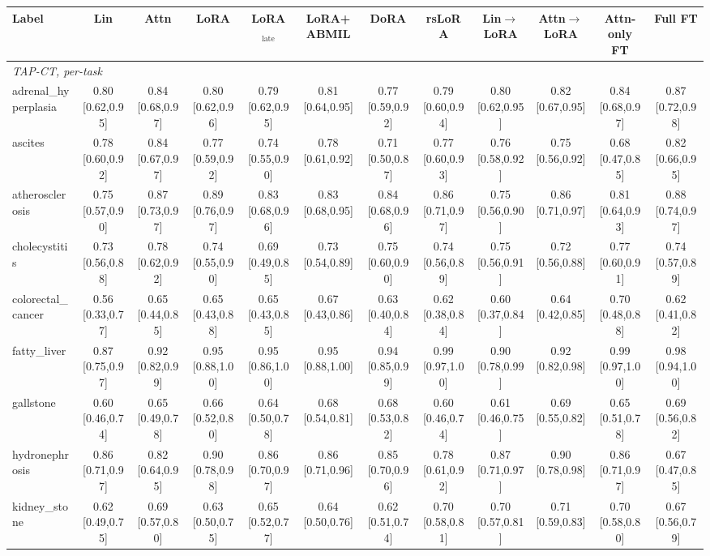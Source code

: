 \begin{tabular}{lccccccccccc}
\toprule
Label & Lin & Attn & LoRA & LoRA$_{\text{late}}$ & LoRA+ABMIL & DoRA & rsLoRA & Lin$\to$LoRA & Attn$\to$LoRA & Attn-only FT & Full FT \\
\midrule
\multicolumn{12}{l}{\textit{TAP-CT, per-task}} \\
adrenal\_hyperplasia & 0.80 [0.62,0.95] & 0.84 [0.68,0.97] & 0.80 [0.62,0.96] & 0.79 [0.62,0.95] & 0.81 [0.64,0.95] & 0.77 [0.59,0.92] & 0.79 [0.60,0.94] & 0.80 [0.62,0.95] & 0.82 [0.67,0.95] & 0.84 [0.68,0.97] & 0.87 [0.72,0.98] \\
ascites & 0.78 [0.60,0.92] & 0.84 [0.67,0.97] & 0.77 [0.59,0.92] & 0.74 [0.55,0.90] & 0.78 [0.61,0.92] & 0.71 [0.50,0.87] & 0.77 [0.60,0.93] & 0.76 [0.58,0.92] & 0.75 [0.56,0.92] & 0.68 [0.47,0.85] & 0.82 [0.66,0.95] \\
atherosclerosis & 0.75 [0.57,0.90] & 0.87 [0.73,0.97] & 0.89 [0.76,0.97] & 0.83 [0.68,0.96] & 0.83 [0.68,0.95] & 0.84 [0.68,0.96] & 0.86 [0.71,0.97] & 0.75 [0.56,0.90] & 0.86 [0.71,0.97] & 0.81 [0.64,0.93] & 0.88 [0.74,0.97] \\
cholecystitis & 0.73 [0.56,0.88] & 0.78 [0.62,0.92] & 0.74 [0.55,0.90] & 0.69 [0.49,0.85] & 0.73 [0.54,0.89] & 0.75 [0.60,0.90] & 0.74 [0.56,0.89] & 0.75 [0.56,0.91] & 0.72 [0.56,0.88] & 0.77 [0.60,0.91] & 0.74 [0.57,0.89] \\
colorectal\_cancer & 0.56 [0.33,0.77] & 0.65 [0.44,0.85] & 0.65 [0.43,0.88] & 0.65 [0.43,0.85] & 0.67 [0.43,0.86] & 0.63 [0.40,0.84] & 0.62 [0.38,0.84] & 0.60 [0.37,0.84] & 0.64 [0.42,0.85] & 0.70 [0.48,0.88] & 0.62 [0.41,0.82] \\
fatty\_liver & 0.87 [0.75,0.97] & 0.92 [0.82,0.99] & 0.95 [0.88,1.00] & 0.95 [0.86,1.00] & 0.95 [0.88,1.00] & 0.94 [0.85,0.99] & 0.99 [0.97,1.00] & 0.90 [0.78,0.99] & 0.92 [0.82,0.98] & 0.99 [0.97,1.00] & 0.98 [0.94,1.00] \\
gallstone & 0.60 [0.46,0.74] & 0.65 [0.49,0.78] & 0.66 [0.52,0.80] & 0.64 [0.50,0.78] & 0.68 [0.54,0.81] & 0.68 [0.53,0.82] & 0.60 [0.46,0.74] & 0.61 [0.46,0.75] & 0.69 [0.55,0.82] & 0.65 [0.51,0.78] & 0.69 [0.56,0.82] \\
hydronephrosis & 0.86 [0.71,0.97] & 0.82 [0.64,0.95] & 0.90 [0.78,0.98] & 0.86 [0.70,0.97] & 0.86 [0.71,0.96] & 0.85 [0.70,0.96] & 0.78 [0.61,0.92] & 0.87 [0.71,0.97] & 0.90 [0.78,0.98] & 0.86 [0.71,0.97] & 0.67 [0.47,0.85] \\
kidney\_stone & 0.62 [0.49,0.75] & 0.69 [0.57,0.80] & 0.63 [0.50,0.75] & 0.65 [0.52,0.77] & 0.64 [0.50,0.76] & 0.62 [0.51,0.74] & 0.70 [0.58,0.81] & 0.70 [0.57,0.81] & 0.71 [0.59,0.83] & 0.70 [0.58,0.80] & 0.67 [0.56,0.79] \\

\end{tabular}
